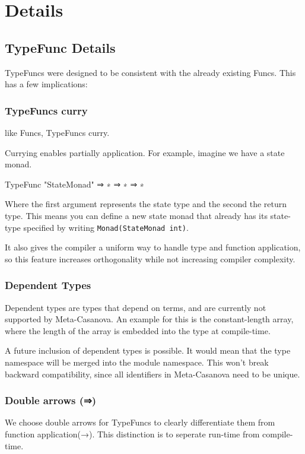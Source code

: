 \section{Details}

\pagebreak

\subsection{TypeFunc Details}
\begin{multicols}{2}\noindent
  TypeFuncs were designed to be consistent with the already existing Funcs.
  This has a few implications:

  \subsubsection*{TypeFuncs curry}
  like Funcs, TypeFuncs curry.

  Currying enables partially application.
  For example, imagine we have a state monad.
  
  \begin{code}
  TypeFunc "StateMonad" ⇒ ∗ ⇒ ∗ ⇒ ∗
  \end{code}

  \noindent Where the first argument represents the state type and the second the return type.
  This means you can define a new state monad that already has its state-type specified by writing \verb|Monad(StateMonad int)|.

  It also gives the compiler a uniform way to handle type and function application,
  so this feature increases orthogonality while not increasing compiler complexity.
  
  \subsubsection*{Dependent Types}
  Dependent types are types that depend on terms, and are currently not supported by Meta-Casanova.
  An example for this is the constant-length array, where the length of the array is embedded into the type at compile-time.
  
  A future inclusion of dependent types is possible.
  It would mean that the type namespace will be merged into the module namespace.
  This won't break backward compatibility, since all identifiers in Meta-Casanova need to be unique.

  \subsubsection*{Double arrows (⇒)}
  We choose double arrows for TypeFuncs to clearly differentiate them from function application(→).
  This distinction is to seperate run-time from compile-time.


\end{multicols}

